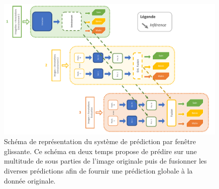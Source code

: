 \begin{figure}[H]
    \centering
    \includegraphics[width=\linewidth]{contents/chapter_5/resources/scheme_image_improvement_sliding_features.pdf}
    \caption{Schéma de représentation du système de prédiction par fenêtre glissante. Ce schéma en deux temps propose de prédire sur une multitude de sous parties de l'image originale puis de fusionner les diverses prédictions afin de fournir une prédiction globale à la donnée originale.}
    \label{fig:scheme_image_improvement_sliding_features}
\end{figure}\par

